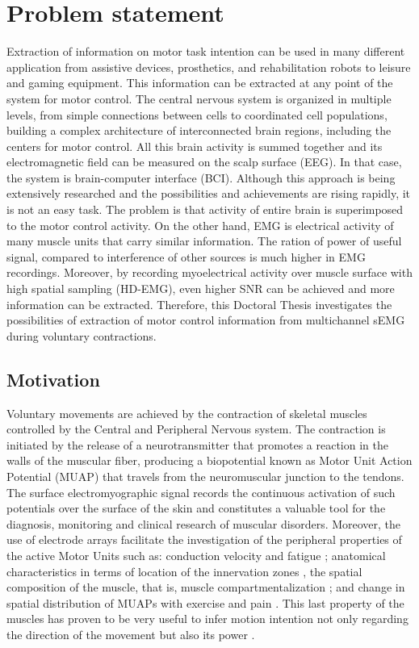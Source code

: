 \chapter{Problem statement}

Extraction of information on motor task intention can be used in many different application from assistive devices, prosthetics, and rehabilitation robots to leisure and gaming equipment. This information can be extracted at any point of the system for motor control. The central nervous system is organized in multiple levels, from simple connections between cells to coordinated cell populations, building a complex architecture of interconnected brain regions, including the centers for motor control. All this brain activity is summed together and its electromagnetic field can be measured on the scalp surface (EEG). In that case, the system is brain-computer interface (BCI). Although this approach is being extensively researched and the possibilities and achievements are rising rapidly, it is not an easy task. The problem is that activity of entire brain is superimposed to the motor control activity.
On the other hand, EMG is electrical activity of many muscle units that carry similar information. The ration of power of useful signal, compared to interference of other sources is much higher in EMG recordings. Moreover, by recording myoelectrical activity over muscle surface with high spatial sampling (HD-EMG), even higher SNR can be achieved and more information can be extracted. Therefore, this Doctoral Thesis investigates the possibilities of extraction of motor control information from multichannel sEMG during voluntary contractions.

    
    
    \section{Motivation}
    
    Voluntary movements are achieved by the contraction of skeletal muscles controlled by the Central and Peripheral Nervous system. The contraction is initiated by the release of a neurotransmitter that promotes a reaction in the walls of the muscular fiber, producing a biopotential known as Motor Unit Action Potential (MUAP) that travels from the neuromuscular junction to the tendons. The surface electromyographic signal records the continuous activation of such potentials over the surface of the skin and constitutes a valuable tool for the diagnosis, monitoring and clinical research of muscular disorders. Moreover, the use of electrode arrays facilitate the investigation of the peripheral properties of the active Motor Units such as: conduction velocity and fatigue \citep{Soares2015}; anatomical characteristics in terms of location of the innervation zones \citep{Beck2012}, the spatial composition of the muscle, that is, muscle compartmentalization \citep{Vieira2010}; and change in spatial distribution of MUAPs with exercise and pain \citep{Madeleine2006}. This last property of the muscles has proven to be very useful to infer motion intention not only regarding the direction of the movement but also its power \citep{Rojas-Martinez2013}.
    
